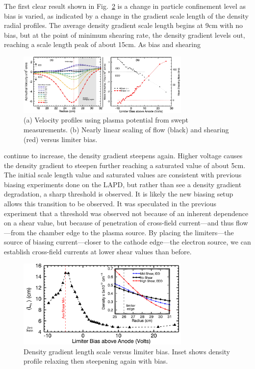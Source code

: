 \documentclass[%
 aps,
 prl,
 amsmath,amssymb,
 reprint,%
]{revtex4-1}
\begin{document}
The first clear result shown in Fig.~\ref{fig:densgrad} is a change in particle confinement level as bias is varied, as indicated by a change in the gradient scale length of the density radial profiles. The average density gradient scale length begins at 9cm with no bias, but at the point of minimum shearing rate, the density gradient levels out, reaching a scale length peak of about 15cm. As bias and shearing 
\begin{figure}
\begin{center}
\includegraphics[width=8.5cm]{velocity_flowshear.pdf}%
\caption{\label{fig:velocity_flowshear} (a) Velocity profiles using plasma potential from swept measurements. (b) Nearly linear scaling of flow (black) and shearing (red) versus limiter bias.}
\end{center}
\end{figure}
continue to increase, the density gradient steepens again. Higher voltage causes the density gradient to steepen further reaching a saturated value of about 5cm. The initial scale length value and saturated values are consistent with previous biasing experiments done on the LAPD\cite{carter09}, but rather than see a density gradient degradation, a sharp threshold is observed. It is likely the new biasing setup allows this transition to be observed. It was speculated in the previous experiment that a threshold was observed not because of an inherent dependence on a shear value, but because of penetration of cross-field current---and thus flow---from the chamber edge to the plasma source. By placing the limiters---the source of biasing current---closer to the cathode edge---the electron source, we can establish cross-field currents at lower shear values than before.

\begin{figure}
\begin{center}
\includegraphics[width=8.5cm]{densgrad.pdf}%
\caption{\label{fig:densgrad} Density gradient length scale versus limiter bias. Inset shows density profile relaxing then steepening again with bias.}
\end{center}
\end{figure}
\end{document}
